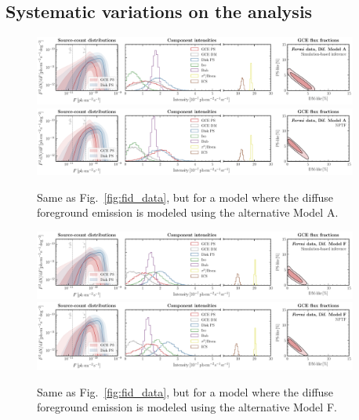 \documentclass[prd,aps,10pt,nofootinbib,twocolumn,superscriptaddress,preprintnumbers,balancelastpage,longbibliography]{revtex4-1}
\begin{document}
\subsection{Systematic variations on the analysis}
\label{sec:systematics}

%
\begin{figure}
\centering
\includegraphics[width=0.95\textwidth]{plots/data_fid_sbi_modelA.pdf}
\includegraphics[width=0.95\textwidth]{plots/data_fid_nptf_modelA.pdf}
\caption{Same as Fig.~\ref{fig:fid_data}, but for a model where the diffuse foreground emission is modeled using the alternative Model A.}
\label{fig:fid_data_modelA}
\end{figure}
%

%
\begin{figure}
\centering
\includegraphics[width=0.95\textwidth]{plots/data_fid_sbi_modelF.pdf}
\includegraphics[width=0.95\textwidth]{plots/data_fid_nptf_modelF.pdf}
\caption{Same as Fig.~\ref{fig:fid_data}, but for a model where the diffuse foreground emission is modeled using the alternative Model F.}
\label{fig:fid_data_modelF}
\end{figure}
%
\end{document}
